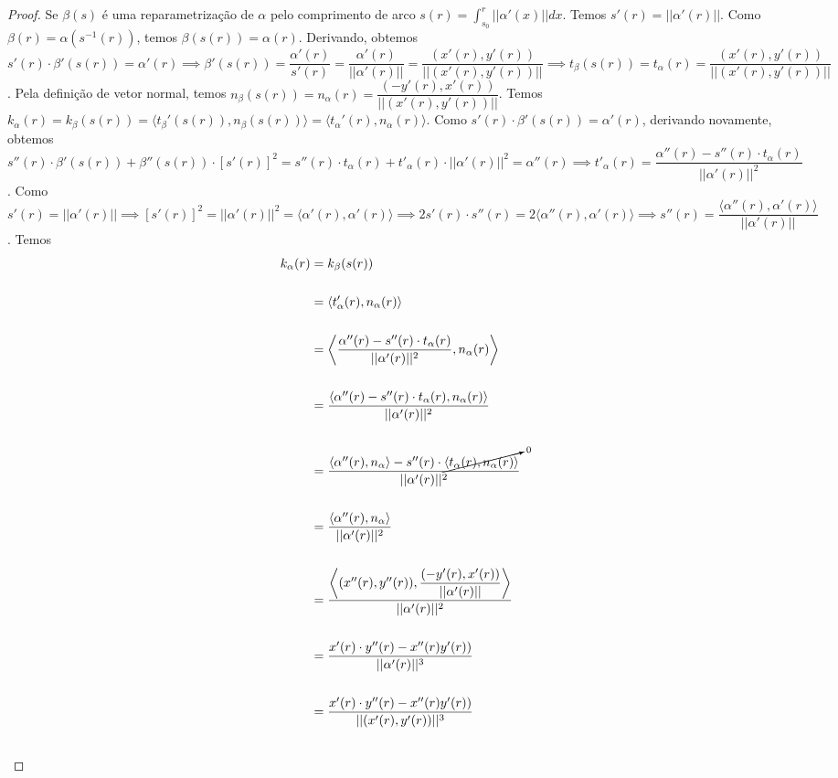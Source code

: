 \documentclass[12pt,leqno,twoside]{amsart}
\theoremstyle{definition}
\begin{document}
	\begin{proof}
		Se $\beta(s)$ é uma reparametrização de $\alpha$ pelo comprimento de arco $s(r) = \displaystyle\int_{s_0}^{r}|| \alpha'(x)|| dx$. Temos $s'(r) = || \alpha'(r)||$. Como $\beta(r) = \alpha(s^{-1}(r))$, temos $\beta(s(r)) = \alpha(r)$. Derivando, obtemos $s'(r) \cdot \beta'(s(r)) = \alpha'(r) \implies \beta'(s(r)) = \dfrac{\alpha'(r)}{s'(r)} = \dfrac{\alpha'(r)}{||\alpha'(r)||} = \dfrac{(x'(r), y'(r))}{|| (x'(r),y'(r))|| } \implies t_{\beta}(s(r)) = t_{\alpha}(r) = \dfrac{(x'(r), y'(r))}{|| (x'(r),y'(r))|| }$. Pela definição de vetor normal, temos $n_{\beta}(s(r)) = n_{\alpha}(r) = \dfrac{(-y'(r), x'(r))}{|| (x'(r),y'(r))|| }$. Temos $k_{\alpha}(r) = k_{\beta}(s(r)) = \langle t_{\beta}'(s(r)), n_{\beta}(s(r)) \rangle = \langle t_{\alpha}'(r), n_\alpha(r)\rangle$. Como $s'(r) \cdot \beta'(s(r)) = \alpha'(r) $, derivando novamente, obtemos $s''(r)\cdot \beta'(s(r)) + \beta''(s(r)) \cdot \left[s'(r)\right]^2 = s''(r) \cdot t_{\alpha}(r) + t'_{\alpha}(r) \cdot || \alpha'(r)||^2 = \alpha''(r)\implies t'_{\alpha}(r) =\dfrac{ \alpha''(r) -  s''(r) \cdot t_\alpha(r)}{||\alpha'(r) ||^2} $. Como $s'(r) = || \alpha'(r)|| \implies \left[ s'(r) \right]^2 = ||\alpha'(r)||^2 = \langle \alpha'(r) , \alpha'(r) \rangle \implies  2s'(r) \cdot s''(r) = 2\langle \alpha''(r), \alpha'(r) \rangle \implies s''(r) = \dfrac{\langle \alpha''(r) , \alpha'(r) \rangle}{||\alpha'(r)||}$. Temos \begin{align*}
			k_{\alpha}(r) &= k_{\beta}(s(r)) \\~\\
			&= \langle t'_{\alpha}(r) , n_{\alpha}(r) \rangle \\~\\
			&= \left\langle \dfrac{ \alpha''(r) -  s''(r) \cdot t_\alpha(r)}{||\alpha'(r) ||^2} , n_{\alpha}(r) \right\rangle \\~\\
			&= \dfrac{\langle \alpha''(r) -  s''(r) \cdot t_\alpha(r) , n_{\alpha}(r) \rangle}{|| \alpha'(r) ||^2 } \\~\\
			&= \dfrac{\langle \alpha''(r)  , n_{\alpha} \rangle -s''(r) \cdot \cancelto{0}{\langle t_\alpha(r) , n_{\alpha}(r) \rangle}}{|| \alpha'(r) ||^2 } \\~\\
			&= \dfrac{\langle \alpha''(r)  , n_{\alpha} \rangle }{|| \alpha'(r) ||^2 } \\~\\
			&= \dfrac{\left\langle (x''(r), y''(r))  , \dfrac{(-y'(r), x'(r))}{|| \alpha'(r) ||} \right\rangle }{|| \alpha'(r) ||^2 } \\~\\
			&= \dfrac{ x'(r)\cdot y''(r) - x''(r) y'(r) )  }{|| \alpha'(r) ||^3 } \\~\\
			&= \dfrac{ x'(r)\cdot y''(r) - x''(r) y'(r) )  }{|| (x'(r), y'(r))  ||^3 } \\~\\
		\end{align*}
	\end{proof}
\end{document}
